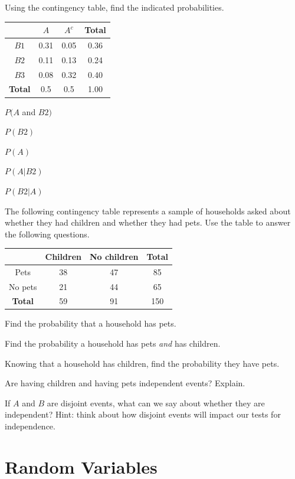 \documentclass[
]{book}
\begin{document}
Using the contingency table, find the indicated probabilities.

\begin{longtable}[]{@{}cccc@{}}
\toprule\noalign{}
& \(A\) & \(A^c\) & Total \\
\midrule\noalign{}
\endhead
\bottomrule\noalign{}
\endlastfoot
\(B1\) & 0.31 & 0.05 & 0.36 \\
\(B2\) & 0.11 & 0.13 & 0.24 \\
\(B3\) & 0.08 & 0.32 & 0.40 \\
\textbf{Total} & 0.5 & 0.5 & 1.00 \\
\end{longtable}

\(P(A\) and \(B2)\)

\(P(B2)\)

\(P(A)\)

\(P(A|B2)\)

\(P(B2|A)\)

The following contingency table represents a sample of households asked about whether they had children and whether they had pets. Use the table to answer the following questions.

\begin{longtable}[]{@{}cccc@{}}
\toprule\noalign{}
& Children & No children & Total \\
\midrule\noalign{}
\endhead
\bottomrule\noalign{}
\endlastfoot
Pets & 38 & 47 & 85 \\
No pets & 21 & 44 & 65 \\
\textbf{Total} & 59 & 91 & 150 \\
\end{longtable}

Find the probability that a household has pets.

Find the probability a household has pets \emph{and} has children.

Knowing that a household has children, find the probability they have pets.

Are having children and having pets independent events? Explain.

If \(A\) and \(B\) are disjoint events, what can we say about whether they are independent? Hint: think about how disjoint events will impact our tests for independence.

\chapter{Random Variables}\label{random-variables}
\end{document}
